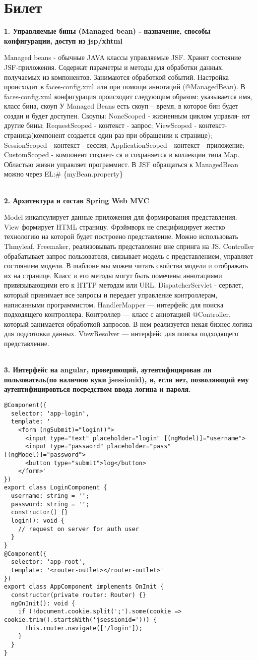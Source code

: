 \documentclass{article}
\newcommand{\bil}[5]{%
        \section{Билет}
        \textbf{1. #1}

        #4
        \\
        \textbf{2. #2}
        
        #5
        \\
        \textbf{3. #3}
}
\begin{document}
\bil{Управляемые бины (Managed bean) - назначение, способы конфигурации, доступ из jsp/xhtml}{Архитектура и состав Spring Web MVC}{Интерфейс на angular, проверяющий, аутентифицирован ли пользователь(по наличию куки jsessionid), и, если нет, позволяющий ему аутентифицировться посредством ввода логина и пароля.}{
    Managed beans - обычные JAVA классы управляемые JSF. Хранят состояние JSF-приложения. 
    Содержат параметры и методы для обработки данных, получаемых из компонентов. 
    Занимаются обработкой событий. Настройка происходит в faces-config.xml или при помощи аннотаций (@ManagedBean). 
    В faces-config.xml конфигурация происходит следующим образом: указывается имя, класс бина, скоуп
    У Managed Beans есть скоуп – время, в которое бин будет создан и будет доступен. 
    Скоупы: NoneScoped - жизненным циклом управля- ют другие бины; RequestScoped - контекст - запрос; 
    ViewScoped - контекст-страница(компонент создается один раз при обращении к странице); 
    SessionScoped - контекст - сессия; ApplicationScoped - контекст - приложение; 
    CustomScoped - компонент создает- ся и сохраняется в коллекции типа Map.
    Областью жизни управляет программист. В JSF обращаться к ManagedBean можно через EL:\# \{myBean.property\}
}{
    Model инкапсулирует данные приложения для формирования представления. 
    View формирует HTML страницу. 
    Фрэймворк не специфицирует жестко технологию на которой будет построено представление. 
    Можно использовать Thmyleaf, Freemaker, реализовывать представление вне спринга на JS. 
    Controller обрабатывает запрос пользователя, связывает модель с представлением, управляет состоянием модели. 
    В шаблоне мы можем читать свойства модели и отображать их на странице. 
    Класс и его методы могут быть помечены аннотациями привязывающими его к HTTP методам или URL. 
    DispatcherServlet - сервлет, который принимает все запросы и передает управление контроллерам, написанными программистом. 
    HandlerMapper — интерфейс для поиска подходящего контроллера. Контроллер — класс с аннотацией @Controller, который занимается обработкой запросов. 
    В нем реализуется некая бизнес логика для подготовки данных. ViewResolver — интерфейс для поиска подходящего представление.
}
\begin{lstlisting}[frame=single, basicstyle=\ttfamily, breaklines=true, breakatwhitespace=true, postbreak=\mbox{\textcolor{red}{$\hookrightarrow$}\space}]
@Component({
  selector: 'app-login',
  template: '
    <form (ngSubmit)="login()">
      <input type="text" placeholder="login" [(ngModel)]="username">
      <input type="password" placeholder="pass" [(ngModel)]="password">
      <button type="submit">log</button>
    </form>'
})
export class LoginComponent {
  username: string = '';
  password: string = '';
  constructor() {}
  login(): void {
    // request on server for auth user
  }
}
@Component({
  selector: 'app-root',
  template: '<router-outlet></router-outlet>'
})
export class AppComponent implements OnInit {
  constructor(private router: Router) {}
  ngOnInit(): void {
    if (!document.cookie.split(';').some(cookie => cookie.trim().startsWith('jsessionid='))) {
      this.router.navigate(['/login']);
    }
  }
}
\end{lstlisting}
\end{document}
